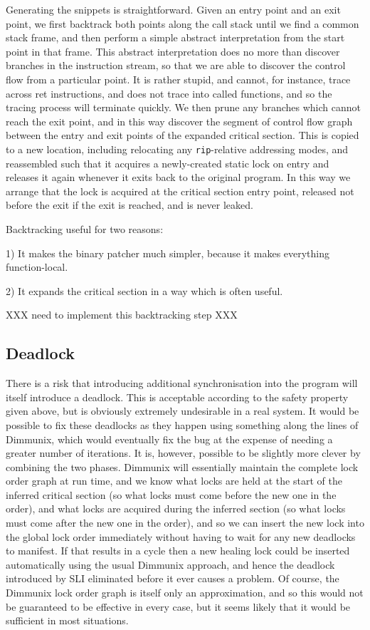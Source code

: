 \documentclass[10pt,a4paper]{report}
\begin{document}
Generating the snippets is straightforward.  Given an entry point and
an exit point, we first backtrack both points along the call stack
until we find a common stack frame, and then perform a simple abstract
interpretation from the start point in that frame.  This abstract
interpretation does no more than discover branches in the instruction
stream, so that we are able to discover the control flow from a
particular point.  It is rather stupid, and cannot, for instance,
trace across ret instructions, and does not trace into called
functions, and so the tracing process will terminate quickly.  We then
prune any branches which cannot reach the exit point, and in this way
discover the segment of control flow graph between the entry and exit
points of the expanded critical section.  This is copied to a new
location, including relocating any \verb|rip|-relative addressing
modes, and reassembled such that it acquires a newly-created static
lock on entry and releases it again whenever it exits back to the
original program.  In this way we arrange that the lock is acquired at
the critical section entry point, released not before the exit if the
exit is reached, and is never leaked.

Backtracking useful for two reasons:

1) It makes the binary patcher much simpler, because it makes
everything function-local.

2) It expands the critical section in a way which is often useful.

XXX need to implement this backtracking step XXX

\subsection{Deadlock}

There is a risk that introducing additional synchronisation into the
program will itself introduce a deadlock.  This is acceptable
according to the safety property given above, but is obviously
extremely undesirable in a real system.  It would be possible to fix
these deadlocks as they happen using something along the lines of
Dimmunix\needCite{}, which would eventually fix the bug at the expense
of needing a greater number of iterations.  It is, however, possible
to be slightly more clever by combining the two phases.  Dimmunix will
essentially maintain the complete lock order graph at run time, and we
know what locks are held at the start of the inferred critical section
(so what locks must come before the new one in the order), and what
locks are acquired during the inferred section (so what locks must
come after the new one in the order), and so we can insert the new
lock into the global lock order immediately without having to wait for
any new deadlocks to manifest.  If that results in a cycle then a new
healing lock could be inserted automatically using the usual Dimmunix
approach, and hence the deadlock introduced by SLI eliminated before
it ever causes a problem.  Of course, the Dimmunix lock order graph is
itself only an approximation, and so this would not be guaranteed to
be effective in every case, but it seems likely that it would be
sufficient in most situations.
\end{document}
